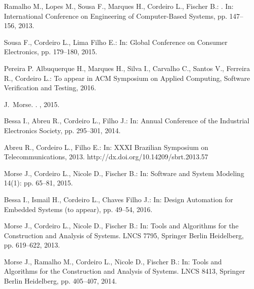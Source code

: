\documentclass{acm_sen_article}
\begin{document}
\begin{thebibliography}{1}
Ramalho M., Lopes M., Sousa F., Marques H., Cordeiro L., Fischer B.:
.
\newblock In: International Conference on Engineering of Computer-Based Systems, pp. 147--156, 2013.

Sousa F., Cordeiro L., Lima Filho E.: 
\newblock In: Global Conference on Consumer Electronics, pp. 179--180, 2015.

Pereira P.  Albuquerque H., Marques H., Silva I., Carvalho C., Santos V., Ferreira R., Cordeiro L.: 
\newblock To appear in ACM Symposium on Applied Computing, Software Verification and Testing, 2016. 

J.~Morse.
.
, 2015.

Bessa I., Abreu R., Cordeiro L., Filho J.:
\newblock In: Annual Conference of the Industrial Electronics Society, pp. 295--301, 2014.

Abreu R., Cordeiro L., Filho E.:
\newblock In: XXXI Brazilian Symposium on Telecommunications, 2013.
\newblock http://dx.doi.org/10.14209/sbrt.2013.57

Morse J., Cordeiro L., Nicole D., Fischer B.:
\newblock In: Software and System Modeling 14(1): pp. 65--81, 2015.

Bessa I., Ismail H., Cordeiro L., Chaves Filho J.:
\newblock In: Design Automation for Embedded Systems (to appear), pp. 49--54, 2016.

Morse J., Cordeiro L., Nicole D., Fischer B.:
\newblock In: Tools and Algorithms for the Construction and Analysis of
  Systems. LNCS 7795, Springer Berlin Heidelberg, pp. 619--622, 2013.

Morse J., Ramalho M., Cordeiro L., Nicole D., Fischer B.:
\newblock In: Tools and Algorithms for the Construction and Analysis of
  Systems. LNCS 8413, Springer Berlin Heidelberg, pp. 405--407, 2014.

\end{thebibliography}




\end{document}
